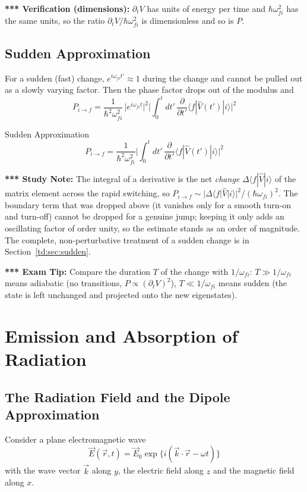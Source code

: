 \documentclass[11pt,a4paper]{article}
\begin{document}
\textbf{*** Verification (dimensions):} $\partial_tV$ has units of energy per time and $\hbar\omega_{fi}^2$ has the same units, so the ratio $\partial_tV/\hbar\omega_{fi}^2$ is dimensionless and so is $P$.

\subsection{Sudden Approximation}
For a sudden (fast) change, $e^{i\omega_{fi}t'}\approx1$ during the change and cannot be pulled out as a slowly varying factor. Then the phase factor drops out of the modulus and
\[
P_{i\to f}=\frac1{\hbar^2\omega_{fi}^2}\,\big|e^{i\omega_{fi}t}\big|^2\Big|\int_0^tdt'\,\frac\partial{\partial t'}\langle f|\hat V(t')|i\rangle\Big|^2
\]
\begin{thm}{Sudden Approximation}
\[
P_{i\to f}=\frac1{\hbar^2\omega_{fi}^2}\Big|\int_0^tdt'\,\frac\partial{\partial t'}\langle f|\hat V(t')|i\rangle\Big|^2
\]
\end{thm}

\textbf{*** Study Note:} The integral of a derivative is the net \textit{change} $\Delta\langle f|\hat V|i\rangle$ of the matrix element across the rapid switching, so $P_{i\to f}\sim|\Delta\langle f|\hat V|i\rangle|^2/(\hbar\omega_{fi})^2$. The boundary term that was dropped above (it vanishes only for a smooth turn-on and turn-off) cannot be dropped for a genuine jump; keeping it only adds an oscillating factor of order unity, so the estimate stands as an order of magnitude. The complete, non-perturbative treatment of a sudden change is in Section~\ref{td:sec:sudden}.

\textbf{*** Exam Tip:} Compare the duration $T$ of the change with $1/\omega_{fi}$: $T\gg1/\omega_{fi}$ means adiabatic (no transitions, $P\propto(\partial_tV)^2$), $T\ll1/\omega_{fi}$ means sudden (the state is left unchanged and projected onto the new eigenstates).
\section{Emission and Absorption of Radiation}
\label{td:sec:rad}

\subsection{The Radiation Field and the Dipole Approximation}
Consider a plane electromagnetic wave
\[
\vec E(\vec r,t)=\vec E_0\exp\{i(\vec k\cdot\vec r-\omega t)\}
\]
with the wave vector $\vec k$ along $y$, the electric field along $z$ and the magnetic field along $x$.
\end{document}
